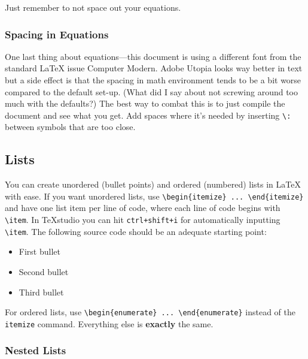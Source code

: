 Just remember to not space out your equations.

\subsubsection{Spacing in Equations}\label{sec.spacingequation}

One last thing about equations---this document is using a different font from the standard \LaTeX{} issue Computer Modern. Adobe Utopia looks way better in text but a side effect is that the spacing in math environment tends to be a bit worse compared to the default set-up. (What did I say about not screwing around too much with the defaults?) The best way to combat this is to just compile the document and see what you get. Add spaces where it's needed by inserting \verb|\:| between symbols that are too close.

\subsection{Lists}\label{sec.lists}

You can create unordered (bullet points) and ordered (numbered) lists in \LaTeX{} with ease. If you want unordered lists, use \verb|\begin{itemize} ... \end{itemize}| and have one list item per line of code, where each line of code begins with \verb|\item|. In \TeX studio you can hit \verb|ctrl+shift+i| for automatically inputting \verb|\item|. The following source code should be an adequate starting point:

\begin{itemize}
	\item First bullet
	\item Second bullet
	\item Third bullet
\end{itemize}

For ordered lists, use \verb|\begin{enumerate} ... \end{enumerate}| instead of the \verb|itemize| command. Everything else is \textbf{exactly} the same.

\subsubsection{Nested Lists}\label{sec.nestedlists}

